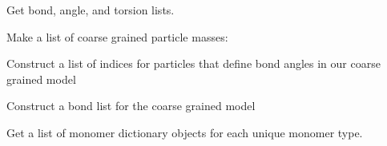 \documentclass[letterpaper,12pt,english,openany,oneside]{sphinxmanual}
\begin{document}
\begin{fulllineitems}
\begin{fulllineitems}
\label{\detokenize{cg_model:cg_model.cgmodel.CGModel.check_energy_conservation}}
Get bond, angle, and torsion lists.

\end{fulllineitems}


\begin{fulllineitems}
\label{\detokenize{cg_model:cg_model.cgmodel.CGModel.constrain_bonds}}
Make a list of coarse grained particle masses:

\end{fulllineitems}


\begin{fulllineitems}
\label{\detokenize{cg_model:cg_model.cgmodel.CGModel.get_bond_angle_list}}
Construct a list of indices for particles that define bond angles in our coarse grained model

\end{fulllineitems}


\begin{fulllineitems}
\label{\detokenize{cg_model:cg_model.cgmodel.CGModel.get_bond_list}}
Construct a bond list for the coarse grained model

\end{fulllineitems}


\begin{fulllineitems}
\label{\detokenize{cg_model:cg_model.cgmodel.CGModel.get_monomer_types}}
Get a list of monomer dictionary objects for each unique monomer type.


\end{fulllineitems}
\end{fulllineitems}
\end{document}
